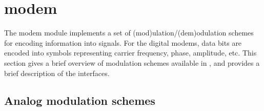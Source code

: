 % 
%

\newpage
\section{modem}
\label{module:modem}
The modem module implements a set of (mod)ulation/(dem)odulation schemes
for encoding information into signals.
For the digital modems, data bits are encoded into symbols representing
carrier frequency, phase, amplitude, etc.
This section gives a brief overview of modulation schemes available in
\liquid, and provides a brief description of the interfaces.


%
%

\subsection{Analog modulation schemes}
\label{module:modem:analog}

